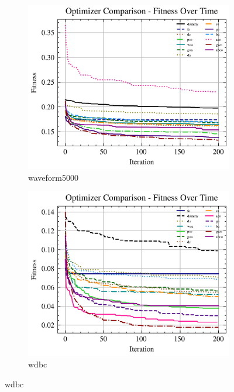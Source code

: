 \begin{figure}[htp]
    \begin{subfigure}[b]{0.45\textwidth}
        \includegraphics[width=\textwidth]{imagenes/fitness_charts/img/binary/waveform5000/optimizers_fitness_svc.png}
        \caption{waveform5000}
        \label{fig:convergencia_waveform5000_svc}
    \end{subfigure}
    \begin{subfigure}[b]{0.45\textwidth}
        \includegraphics[width=\textwidth]{imagenes/fitness_charts/img/binary/wdbc/optimizers_fitness_svc.png}
        \caption{wdbc}
        \label{fig:convergencia_wdbc_svc}
    \end{subfigure}


\end{figure}
